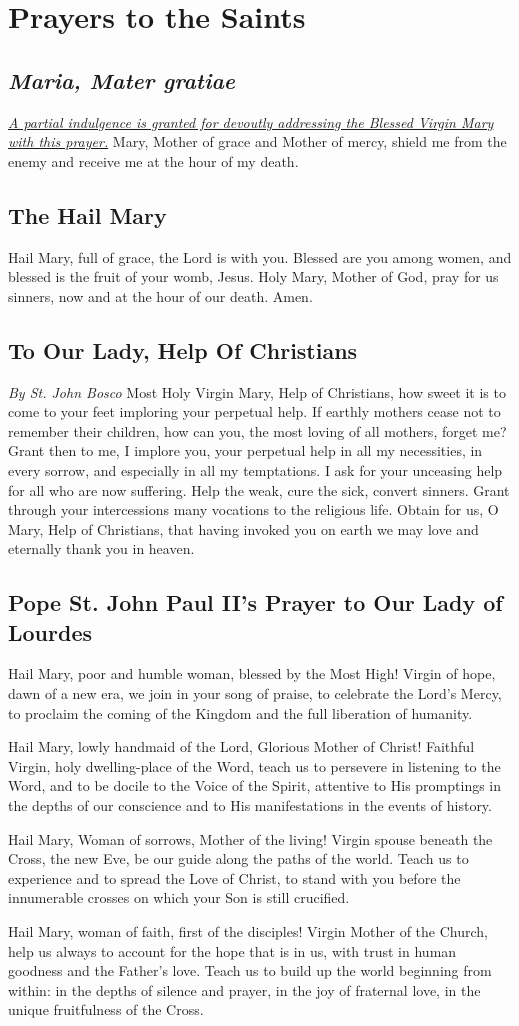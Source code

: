 \documentclass[12pt]{article}
\newcommand{\prayersection}[1]{\section{#1}}
\newcommand{\prayertitle}[1]{\subsection{#1}}
\newcommand{\indulgencedprayertitle}[1]{\prayertitle{#1 \protect\kreuz}}
\newcommand{\emphasis}[1]{\emph{#1}}
\newcommand{\emphasis}[1]{\textsl{#1}}
\newcommand{\foreign}[1]{\emphasis{#1}}
\newcommand{\note}[1]{{\small{\emphasis{#1}}}\newline}
\newcommand{\linkednote}[2]{\hyperlink{#1}{\note{#2}}}
\begin{document}
\newpage

\prayersection{Prayers to the Saints}
\indulgencedprayertitle{\foreign{Maria, Mater gratiae}}
\linkednote{grant17}{A partial indulgence is granted for devoutly addressing the Blessed Virgin Mary with this prayer.}
Mary, Mother of grace and Mother of mercy, shield me from the enemy and receive me at the hour of my death.

\prayertitle{The Hail Mary}
Hail Mary, full of grace, the Lord is with you.
Blessed are you among women, and blessed is the fruit of your womb, Jesus.
Holy Mary, Mother of God, pray for us sinners, now and at the hour of our death.
Amen.

\prayertitle{To Our Lady, Help Of Christians}
\label{prayer:Our_Lady_help_of_Christians}
\note{By St. John Bosco}
Most Holy Virgin Mary, Help of Christians, how sweet it is to come to your feet
imploring your perpetual help.
If earthly mothers cease not to remember their children, how can you, the most loving of all mothers, forget me?
Grant then to me, I implore you, your perpetual help in all my necessities, in every sorrow, and especially in all my temptations.
I ask for your unceasing help for all who are now suffering.
Help the weak, cure the sick, convert sinners.
Grant through your intercessions many vocations to the religious life.
Obtain for us, O Mary, Help of Christians, that having invoked you on earth we may love and eternally thank you in heaven.

\prayertitle{Pope St. John Paul II's Prayer to Our Lady of Lourdes}
\label{prayer:JPII_Lady_of_Lourdes}
Hail Mary, poor and humble woman, blessed by the Most High!
Virgin of hope, dawn of a new era, we join in your song of praise, to celebrate the Lord's Mercy, to proclaim the coming of the Kingdom and the full liberation of humanity.

Hail Mary, lowly handmaid of the Lord, Glorious Mother of Christ!
Faithful Virgin, holy dwelling-place of the Word, teach us to persevere in listening to the Word, and to be docile to the Voice of the Spirit, attentive to His promptings in the depths of our conscience and to His manifestations in the events of history.

Hail Mary, Woman of sorrows, Mother of the living!
Virgin spouse beneath the Cross, the new Eve, be our guide along the paths of the world.
Teach us to experience and to spread the Love of Christ, to stand with you before the innumerable crosses on which your Son is still crucified.

Hail Mary, woman of faith, first of the disciples!
Virgin Mother of the Church, help us always to account for the hope that is in us, with trust in human goodness and the Father's love.
Teach us to build up the world beginning from within:
in the depths of silence and prayer, in the joy of fraternal love, in the unique fruitfulness of the Cross.
\end{document}
